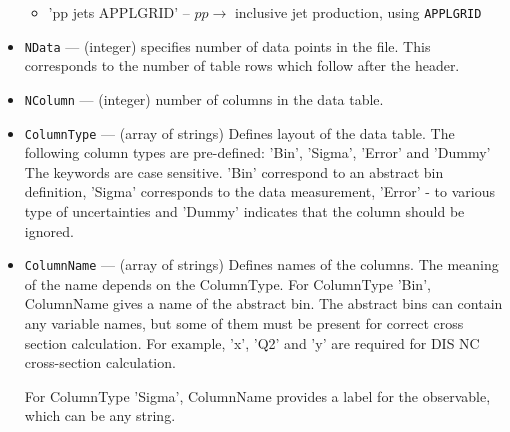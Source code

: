 \documentclass[11pt,a4paper]{article}
\begin{document}
\begin{itemize}
\begin{itemize}
                        \item 'pp jets APPLGRID' -- $pp\to$ inclusive jet production, using
                                     {\tt APPLGRID}
                      \end{itemize}                       
      \item {\tt NData}       --- (integer) specifies number of data points in the file. 
                     This corresponds to the number of table rows which 
                     follow after the header.
      \item {\tt NColumn}     --- (integer) number of columns in the data table.
      \item {\tt ColumnType}  --- (array of strings)
                      Defines layout of the data table. The following column types
                      are pre-defined: 'Bin', 'Sigma', 'Error' and 'Dummy'
                      The keywords are case sensitive. 'Bin' correspond to an
                      abstract bin definition, 'Sigma' corresponds to the data
                      measurement, 'Error' - to various type of uncertainties and
                      'Dummy' indicates that the column should be ignored.
      \item {\tt ColumnName}  --- (array of strings)
                      Defines names of the columns. The meaning of the name depends
                      on the ColumnType. For ColumnType 'Bin', ColumnName gives a
                      name of the abstract bin. The abstract bins can contain
                      any variable names, but some of them must be present for 
                      correct cross section calculation. For example, 'x', 'Q2' and
                      'y' are required for DIS NC cross-section calculation.
 
                      For ColumnType 'Sigma', ColumnName provides a label for 
                      the observable, which can be any string.
 

\end{itemize}
\end{document}

